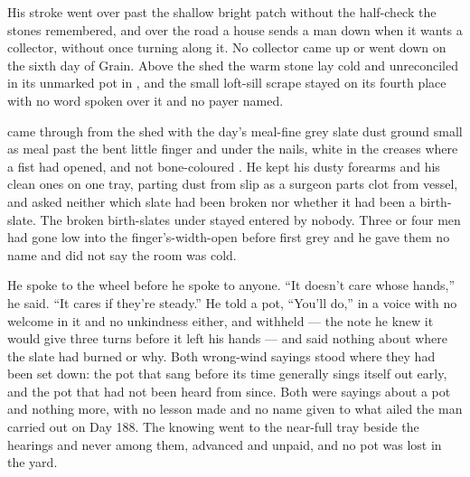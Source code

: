His stroke went over  past the shallow bright patch without the half-check the stones remembered, and over the road a house sends a man down when it wants a collector, without once turning along it. No collector came up or went down  on the sixth day of Grain. Above the shed the warm stone lay cold and unreconciled in its unmarked pot in , and the small loft-sill scrape stayed on its fourth place with no word spoken over it and no payer named.

\scenebreak

 came through from the shed with the day's meal-fine grey slate dust ground small as meal past the bent little finger and under the nails, white in the creases where a fist had opened, and not bone-coloured . He kept his dusty forearms and his clean ones on one tray, parting dust from slip as a surgeon parts clot from vessel, and asked neither which slate had been broken nor whether it had been a birth-slate. The broken birth-slates under  stayed entered by nobody. Three or four men had gone low into the finger's-width-open  before first grey and he gave them no name and did not say the room was cold.

He spoke to the wheel before he spoke to anyone. “It doesn't care whose hands,” he said. “It cares if they're steady.” He told a pot, “You'll do,” in a voice with no welcome in it and no unkindness either, and withheld  --- the note he knew it would give three turns before it left his hands --- and said nothing about where the slate had burned or why. Both wrong-wind sayings stood where they had been set down: the pot that sang before its time generally sings itself out early, and the pot that had not been heard from since. Both were sayings about a pot and nothing more, with no lesson made and no name given to what ailed the man carried out on Day 188. The knowing went to the near-full tray beside the hearings and never among them, advanced and unpaid, and no pot was lost in the yard.

